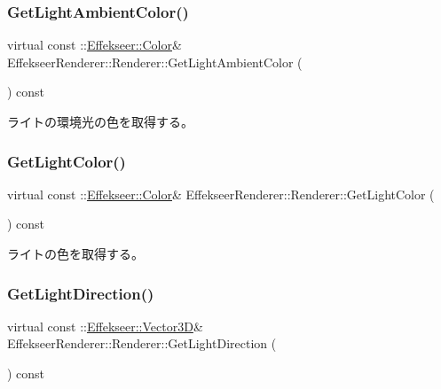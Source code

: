 \subsubsection{\texorpdfstring{Get\+Light\+Ambient\+Color()}{GetLightAmbientColor()}}
{\footnotesize\ttfamily virtual const \+::\mbox{\hyperlink{struct_effekseer_1_1_color}{Effekseer\+::\+Color}}\& Effekseer\+Renderer\+::\+Renderer\+::\+Get\+Light\+Ambient\+Color (\begin{DoxyParamCaption}{ }\end{DoxyParamCaption}) const\hspace{0.3cm}{\ttfamily [pure virtual]}}



ライトの環境光の色を取得する。 

\mbox{\label{class_effekseer_renderer_1_1_renderer_af1ed44772dd362bd7dbed42823da0411}} 
\subsubsection{\texorpdfstring{Get\+Light\+Color()}{GetLightColor()}}
{\footnotesize\ttfamily virtual const \+::\mbox{\hyperlink{struct_effekseer_1_1_color}{Effekseer\+::\+Color}}\& Effekseer\+Renderer\+::\+Renderer\+::\+Get\+Light\+Color (\begin{DoxyParamCaption}{ }\end{DoxyParamCaption}) const\hspace{0.3cm}{\ttfamily [pure virtual]}}



ライトの色を取得する。 

\mbox{\label{class_effekseer_renderer_1_1_renderer_a3da04ff6d2ad2a0126a7476703a7c019}} 
\subsubsection{\texorpdfstring{Get\+Light\+Direction()}{GetLightDirection()}}
{\footnotesize\ttfamily virtual const \+::\mbox{\hyperlink{struct_effekseer_1_1_vector3_d}{Effekseer\+::\+Vector3D}}\& Effekseer\+Renderer\+::\+Renderer\+::\+Get\+Light\+Direction (\begin{DoxyParamCaption}{ }\end{DoxyParamCaption}) const\hspace{0.3cm}{\ttfamily [pure virtual]}}



